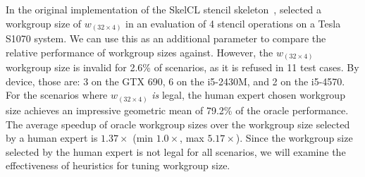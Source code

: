 \documentclass[nonatbib,preprint,10pt]{sigplanconf}
\begin{document}
%

In the original implementation of the SkelCL stencil
skeleton~\cite{Breuer2013}, \citeauthor{Breuer2013} selected a
workgroup size of $w_{(32 \times 4)}$ in an evaluation of 4 stencil
operations on a Tesla S1070 system. We can use this as an additional
parameter to compare the relative performance of workgroup sizes
against. However, the $w_{(32 \times 4)}$ workgroup size is invalid
for 2.6\% of scenarios, as it is refused in 11 test cases. By device,
those are: 3 on the GTX 690, 6 on the i5-2430M, and 2 on the i5-4570.
For the scenarios where $w_{(32 \times 4)}$ \emph{is} legal, the human
expert chosen workgroup size achieves an impressive geometric mean of
79.2\% of the oracle performance. The average speedup of oracle
workgroup sizes over the workgroup size selected by a human expert is
$1.37\times$ (min $1.0\times$, max $5.17\times$). Since the workgroup
size selected by the human expert is not legal for all scenarios, we
will examine the effectiveness of heuristics for tuning workgroup
size.
\end{document}

